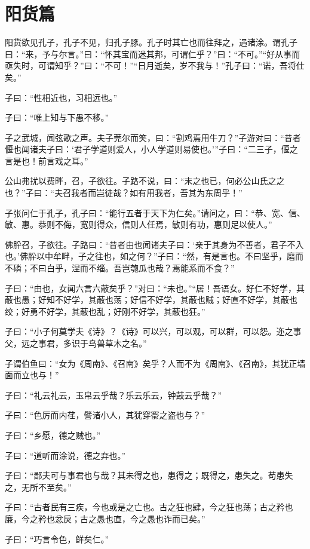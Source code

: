 \documentclass[12pt,a4paper]{ctexbook}
\begin{document}
\section{阳货篇}
阳货欲见孔子，孔子不见，归孔子豚。孔子时其亡也而往拜之，遇诸涂。谓孔子曰：“来，予与尔言。”曰：“怀其宝而迷其邦，可谓仁乎？”曰：“不可。”“好从事而亟失时，可谓知乎？”曰：“不可！”“日月逝矣，岁不我与！”孔子曰：“诺，吾将仕矣。”\par
子曰：“性相近也，习相远也。”\par
子曰：“唯上知与下愚不移。”\par
子之武城，闻弦歌之声。夫子莞尔而笑，曰：“割鸡焉用牛刀？”子游对曰：“昔者偃也闻诸夫子曰：‘君子学道则爱人，小人学道则易使也。’”子曰：“二三子，偃之言是也！前言戏之耳。”\par
公山弗扰以费畔，召，子欲往。子路不说，曰：“末之也已，何必公山氏之之也？”子曰：“夫召我者而岂徒哉？如有用我者，吾其为东周乎！”\par
子张问仁于孔子，孔子曰：“能行五者于天下为仁矣。”请问之，曰：“恭、宽、信、敏、惠。恭则不侮，宽则得众，信则人任焉，敏则有功，惠则足以使人。”\par
佛肸召，子欲往。子路曰：“昔者由也闻诸夫子曰：‘亲于其身为不善者，君子不入也。’佛肸以中牟畔，子之往也，如之何？”子曰：“然，有是言也。不曰坚乎，磨而不磷；不曰白乎，涅而不缁。吾岂匏瓜也哉？焉能系而不食？”\par
子曰：“由也，女闻六言六蔽矣乎？”对曰：“未也。”“居！吾语女。好仁不好学，其蔽也愚；好知不好学，其蔽也荡；好信不好学，其蔽也贼；好直不好学，其蔽也绞；好勇不好学，其蔽也乱；好刚不好学，其蔽也狂。”\par
子曰：“小子何莫学夫《诗》？《诗》可以兴，可以观，可以群，可以怨。迩之事父，远之事君，多识于鸟兽草木之名。”\par
子谓伯鱼曰：“女为《周南》、《召南》矣乎？人而不为《周南》、《召南》，其犹正墙面而立也与！”\par
子曰：“礼云礼云，玉帛云乎哉？乐云乐云，钟鼓云乎哉？”\par
子曰：“色厉而内荏，譬诸小人，其犹穿窬之盗也与？”\par
子曰：“乡愿，德之贼也。”\par
子曰：“道听而涂说，德之弃也。”\par
子曰：“鄙夫可与事君也与哉？其未得之也，患得之；既得之，患失之。苟患失之，无所不至矣。”\par
子曰：“古者民有三疾，今也或是之亡也。古之狂也肆，今之狂也荡；古之矜也廉，今之矜也忿戾；古之愚也直，今之愚也诈而已矣。”\par
子曰：“巧言令色，鲜矣仁。”\par
\end{document}
